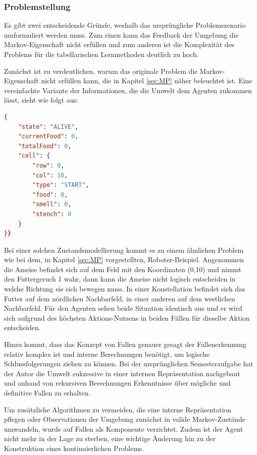 \subsubsection{Problemstellung}
Es gibt zwei entscheidende Gründe, weshalb das ursprüngliche Problemszenario umformuliert werden muss. Zum einen kann das Feedback der Umgebung die Markov-Eigenschaft nicht erfüllen und zum anderen ist die Komplexität des Problems für die tabellarischen Lernmethoden deutlich zu hoch.
\par
Zunächst ist zu verdeutlichen, warum das originale Problem die Markov-Eigenschaft nicht erfüllen kann, die in Kapitel \ref{sec:MP} näher beleuchtet ist. Eine vereinfachte Variante der Informationen, die die Umwelt dem Agenten zukommen lässt, sieht wie folgt aus:
\begin{lstlisting}[language=json,firstnumber=1, label=lst:ursprüngliche Wahrnehmung,caption=Wahrnehmung des Agenten bei dem ursprünglichen Problem]
{
    "state": "ALIVE",
    "currentFood": 0,
    "totalFood": 0,
    "cell": {
        "row": 0,
        "col": 10,
        "type": "START",
        "food": 0,
        "smell": 0,
        "stench": 0
    }
}}
\end{lstlisting}
Bei einer solchen Zustandsmodellierung kommt es zu einem ähnlichen Problem wie bei dem, in Kapitel \ref{sec:MP} vorgestellten, Roboter-Beispiel. Angenommen die Ameise befindet sich auf dem Feld mit den Koordinaten (0,10) und nimmt den Futtergeruch 1 wahr, dann kann die Ameise nicht logisch entscheiden in welche Richtung sie sich bewegen muss. In einer Konstellation befindet sich das Futter auf dem nördlichen Nachbarfeld, in einer anderen auf dem westlichen Nachbarfeld. Für den Agenten sehen beide Situation identisch aus und er wird sich aufgrund des höchsten Aktions-Nutzens in beiden Fällen für dieselbe Aktion entscheiden.
\par 
Hinzu kommt, dass das Konzept von Fallen genauer gesagt der Fallenerkennung relativ komplex ist und interne Berechnungen benötigt, um logische Schlussfolgerungen ziehen zu können. Bei der ursprünglichen Semesteraufgabe hat der Autor die Umwelt sukzessive in einer internen Repräsentation nachgebaut und anhand von rekursiven Berechnungen Erkenntnisse über mögliche und definitive Fallen zu erhalten.
\par 
Um zusätzliche Algorithmen zu vermeiden, die eine interne Repräsentation pflegen oder Observationen der Umgebung zunächst in valide Markov-Zustände umwandeln, wurde  
auf Fallen als Komponente verzichtet. Zudem ist der Agent nicht mehr in der Lage zu sterben, eine wichtige Änderung hin zu der Konstruktion eines kontinuierlichen Problems.   
